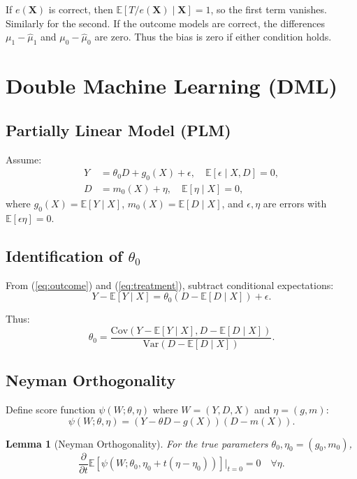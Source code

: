 \documentclass[12pt]{article}
\numberwithin{equation}{section}
\newtheorem{lemma}{Lemma}[section]
\begin{document}
	If $e(\mathbf{X})$ is correct, then $\mathbb{E}[T/e(\mathbf{X}) \mid \mathbf{X}] = 1$, so the first term vanishes. Similarly for the second. If the outcome models are correct, the differences $\mu_1 - \hat{\mu}_1$ and $\mu_0 - \hat{\mu}_0$ are zero. Thus the bias is zero if either condition holds.
	
	\section{Double Machine Learning (DML)}
	
	\subsection{Partially Linear Model (PLM)}
	
	Assume:
	\begin{align}
		Y &= \theta_0 D + g_0(X) + \epsilon, \quad \mathbb{E}[\epsilon \mid X, D] = 0, \label{eq:outcome}\\
		D &= m_0(X) + \eta, \quad \mathbb{E}[\eta \mid X] = 0, \label{eq:treatment}
	\end{align}
	where $g_0(X) = \mathbb{E}[Y \mid X]$, $m_0(X) = \mathbb{E}[D \mid X]$, and $\epsilon, \eta$ are errors with $\mathbb{E}[\epsilon \eta] = 0$.
	
	\subsection{Identification of $\theta_0$}
	
	From (\ref{eq:outcome}) and (\ref{eq:treatment}), subtract conditional expectations:
	\[
	Y - \mathbb{E}[Y \mid X] = \theta_0 (D - \mathbb{E}[D \mid X]) + \epsilon.
	\]
	
	Thus:
	\[
	\theta_0 = \frac{\text{Cov}(Y - \mathbb{E}[Y \mid X], D - \mathbb{E}[D \mid X])}{\text{Var}(D - \mathbb{E}[D \mid X])}.
	\]
	
	\subsection{Neyman Orthogonality}
	
	Define score function $\psi(W; \theta, \eta)$ where $W = (Y, D, X)$ and $\eta = (g, m)$:
	\[
	\psi(W; \theta, \eta) = (Y - \theta D - g(X)) (D - m(X)).
	\]
	
	\begin{lemma}[Neyman Orthogonality]
		For the true parameters $\theta_0, \eta_0 = (g_0, m_0)$,
		\[
		\frac{\partial}{\partial t} \mathbb{E}[\psi(W; \theta_0, \eta_0 + t(\eta - \eta_0))] \bigg|_{t=0} = 0 \quad \forall \eta.
		\]
	\end{lemma}
	
\end{document}
